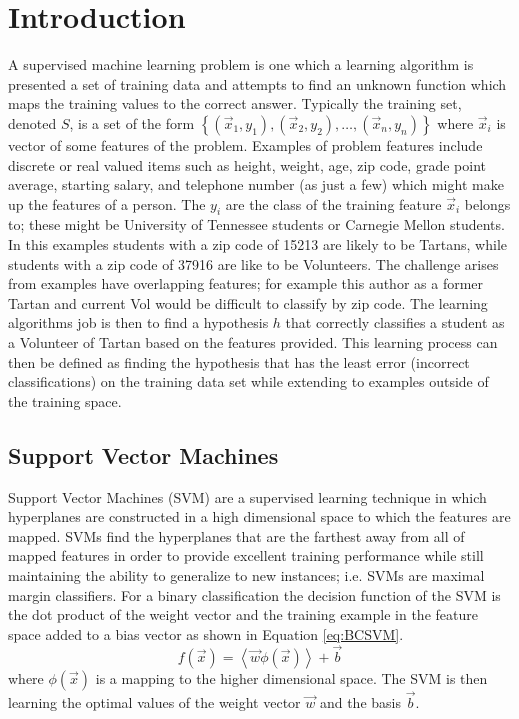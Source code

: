 \section{Introduction}

A supervised machine learning problem is one which a learning algorithm is presented a set of training data and attempts to find an unknown function which maps the training values to the correct answer.
Typically the training set, denoted $S$, is a set of the form $\left \{ (\vec{x}_1,y_1), (\vec{x}_2,y_2), \dots, (\vec{x}_n,y_n) \right \}$ where $\vec{x}_i$ is vector of some features of the problem.
Examples of problem features include discrete or real valued items such as height, weight, age, zip code, grade point average, starting salary, and telephone number (as just a few)  which might make up the features of a person.
The $y_i$ are the class of the training feature $\vec{x}_i$ belongs to; these might be University of Tennessee students or Carnegie Mellon students.
In this examples students with a zip code of 15213 are likely to be Tartans, while students with a zip code of 37916 are like to be Volunteers.
The challenge arises from examples have overlapping features; for example this author as a former Tartan and current Vol would be difficult to classify by zip code.
The learning algorithms job is then to find a hypothesis $h$ that correctly classifies a student as a Volunteer of Tartan based on the features provided.
This learning process can then be defined as finding the hypothesis that has the least error (incorrect classifications) on the training data set while extending to examples outside of the training space.

\subsection{Support Vector Machines}
Support Vector Machines (SVM) are a supervised learning technique in which hyperplanes are constructed in a high dimensional space to which the features are mapped.
SVMs find the hyperplanes that are the farthest away from all of mapped features in order to provide excellent training performance while still maintaining the ability to generalize to new instances; i.e. SVMs are maximal margin classifiers.
For a binary classification the decision function of the SVM is the dot product of the weight vector and the training example in the feature space added to a bias vector as shown in Equation \ref{eq:BCSVM}.
\begin{equation}
\label{eq:BCSVM}
f \left ( \vec{x} \right ) = \left \langle \vec{w} \phi(\vec{x}) \right \rangle + \vec{b}
\end{equation}
where $\phi(\vec{x})$ is a mapping to the higher dimensional space.
The SVM is then learning the optimal values of the weight vector $\vec{w}$ and the basis $\vec{b}$.

